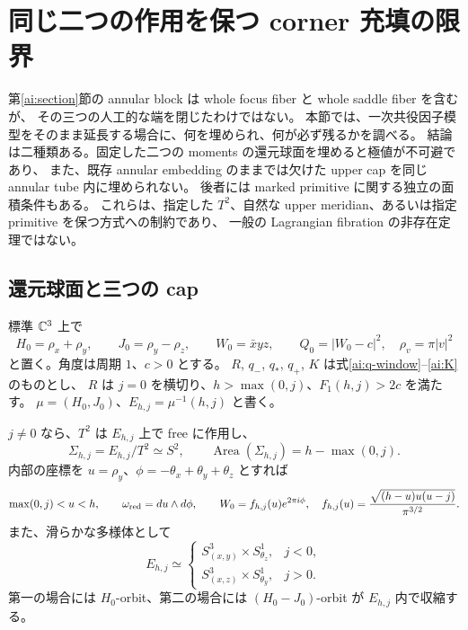 \section{同じ二つの作用を保つ corner 充填の限界}
\label{cf:section}

第\ref{ai:section}節の annular block は whole focus fiber と whole saddle fiber を含むが、
その三つの人工的な端を閉じたわけではない。
本節では、一次共役因子模型をそのまま延長する場合に、何を埋められ、何が必ず残るかを調べる。
結論は二種類ある。固定した二つの moments の還元球面を埋めると極値が不可避であり、
また、既存 annular embedding のままでは欠けた upper cap を同じ annular tube 内に埋められない。
後者には marked primitive に関する独立の面積条件もある。
これらは、指定した $T^2$、自然な upper meridian、あるいは指定 primitive を保つ方式への制約であり、
一般の Lagrangian fibration の非存在定理ではない。

\subsection{還元球面と三つの cap}

標準 $\mathbb C^3$ 上で
\[
 H_0=\rho_x+\rho_y,\qquad J_0=\rho_y-\rho_z,
 \qquad W_0=\bar x yz,\qquad Q_0=|W_0-c|^2,
 \quad \rho_v=\pi|v|^2
\]
と置く。角度は周期 $1$、$c>0$ とする。
$R$, $q_-$, $q_*$, $q_+$, $K$ は式\eqref{ai:q-window}--\eqref{ai:K}のものとし、
$R$ は $j=0$ を横切り、$h>\max(0,j)$、$F_1(h,j)>2c$ を満たす。
$\mu=(H_0,J_0)$、$E_{h,j}=\mu^{-1}(h,j)$ と書く。

\begin{lemma}[球面還元と面積]\label{cf:sphere}
$j\ne0$ なら、$T^2$ は $E_{h,j}$ 上で free に作用し、
\[
 \Sigma_{h,j}=E_{h,j}/T^2\simeq S^2,\qquad
 \operatorname{Area}(\Sigma_{h,j})=h-\max(0,j).
\]
内部の座標を $u=\rho_y$、$\phi=-\theta_x+\theta_y+\theta_z$ とすれば
\[
 \max(0,j)<u<h,\qquad
 \omega_{\rm red}=du\wedge d\phi,\qquad
 W_0=f_{h,j}(u)e^{2\pi i\phi},\quad
 f_{h,j}(u)=\frac{\sqrt{(h-u)u(u-j)}}{\pi^{3/2}}.
\]
また、滑らかな多様体として
\[
 E_{h,j}\simeq
 \begin{cases}
 S^3_{(x,y)}\times S^1_{\theta_z},&j<0,\\
 S^3_{(x,z)}\times S^1_{\theta_y},&j>0.
 \end{cases}
\]
第一の場合には $H_0$-orbit、第二の場合には $(H_0-J_0)$-orbit が $E_{h,j}$ 内で収縮する。
\end{lemma}

